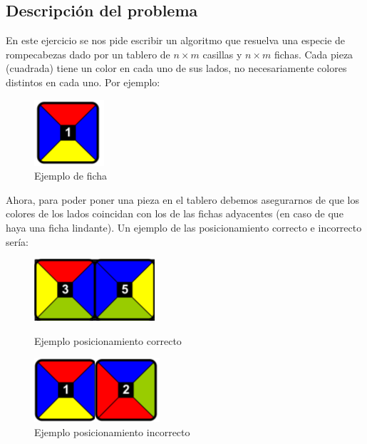 \subsection{Descripci\'on del problema}

En este ejercicio se nos pide escribir un algoritmo que resuelva una especie de rompecabezas dado por un tablero de $n \times m$ casillas y $n \times m$ fichas.
Cada pieza (cuadrada) tiene un color en cada uno de sus lados, no necesariamente colores distintos en cada uno. Por ejemplo: 

\begin{figure}[h]
\begin{center}
\includegraphics[scale=0.4]{./img/ej3_fichas.png}
\caption{Ejemplo de ficha}
\end{center}
\end{figure}

Ahora, para poder poner una pieza en el tablero debemos asegurarnos de que los colores de los lados coincidan con los de las fichas adyacentes (en caso de que haya una ficha lindante). Un ejemplo de las posicionamiento correcto e incorrecto ser\'ia:\\

\begin{figure}[h]
\begin{center}
\includegraphics[scale=0.4]{./img/ej3_fichas_coinciden.png}
\caption{Ejemplo posicionamiento correcto}
\includegraphics[scale=0.4]{./img/ej3_fichas_ncoinciden.png}
\caption{Ejemplo posicionamiento incorrecto}
\end{center}
\end{figure}


